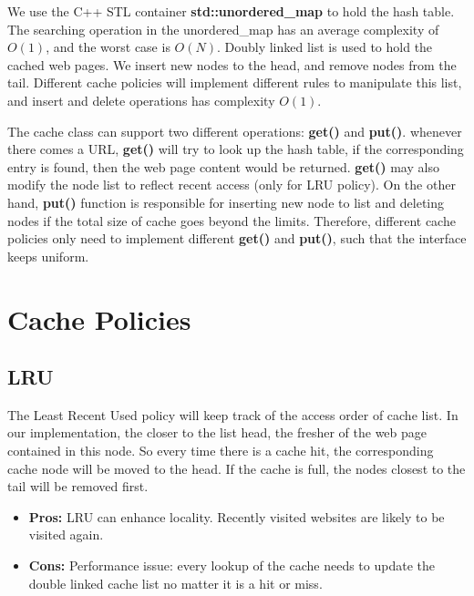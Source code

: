 \documentclass[paper=a4, fontsize=11pt]{scrartcl} %
\numberwithin{equation}{section} %
\numberwithin{figure}{section} %
\numberwithin{table}{section} %
\begin{document}
\vspace{0.5em}

We use the C++ STL container \textbf{std::unordered\_map} to hold the 
hash table. The searching operation in the unordered\_map
has an average complexity of $O(1)$, and the worst case is $O(N)$. Doubly
linked list is used to hold the cached web pages. We insert new nodes
to the head, and remove nodes from the tail. Different cache policies will
implement different rules to manipulate this list, and insert and
delete operations has complexity $O(1)$.

\vspace{0.5em}

The cache class can support two different operations: \textbf{get()} and
\textbf{put()}. whenever there comes a URL, \textbf{get()} will try to look
up the hash table, if the corresponding entry is found, then the web page
content would be returned. 
\textbf{get()} may also modify the node list to reflect recent access
(only for LRU policy). On the other hand, \textbf{put()} function is
responsible for inserting new node to list and deleting nodes if the
total size of cache goes beyond the limits. Therefore, different cache 
policies only need to implement different \textbf{get()} and 
\textbf{put()}, 
such that the interface keeps uniform.

\section{Cache Policies}

\subsection{LRU}
The Least Recent Used policy will keep track of the access order 
of cache list. In our implementation, the closer to the list head, 
the fresher of the web page contained in this node. So every time 
there is a cache hit, the corresponding cache node will be moved to
the head. If the cache is full, the nodes closest to the tail will
be removed first.
\begin{itemize}
\item \textbf{Pros:} LRU can enhance locality. Recently visited websites
are likely to be visited again.
\item \textbf{Cons:} Performance issue: every lookup of the cache needs
to update the double linked cache list no matter it is a hit or
miss.
\end{itemize}
\end{document}
